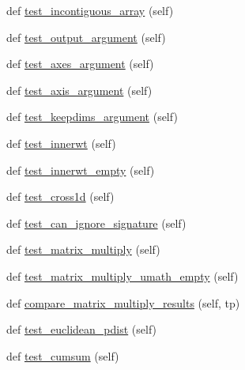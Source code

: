 \begin{DoxyCompactItemize}
\item 
def \hyperlink{classnumpy_1_1core_1_1tests_1_1test__ufunc_1_1TestUfunc_ae36bb4caf0965ee43807cb429fec7da5}{test\+\_\+incontiguous\+\_\+array} (self)
\item 
def \hyperlink{classnumpy_1_1core_1_1tests_1_1test__ufunc_1_1TestUfunc_a72edb9ebd33e63001a1295e0faae3f3a}{test\+\_\+output\+\_\+argument} (self)
\item 
def \hyperlink{classnumpy_1_1core_1_1tests_1_1test__ufunc_1_1TestUfunc_a60cb21686d58cc7c99318f96269d8993}{test\+\_\+axes\+\_\+argument} (self)
\item 
def \hyperlink{classnumpy_1_1core_1_1tests_1_1test__ufunc_1_1TestUfunc_ae047a0677ba08be66418b35d6f2aca14}{test\+\_\+axis\+\_\+argument} (self)
\item 
def \hyperlink{classnumpy_1_1core_1_1tests_1_1test__ufunc_1_1TestUfunc_ad71630de828af6888dab5eda9fe7b313}{test\+\_\+keepdims\+\_\+argument} (self)
\item 
def \hyperlink{classnumpy_1_1core_1_1tests_1_1test__ufunc_1_1TestUfunc_a5a3b0fe32bfec6be8e07f44fa5f2e7b0}{test\+\_\+innerwt} (self)
\item 
def \hyperlink{classnumpy_1_1core_1_1tests_1_1test__ufunc_1_1TestUfunc_a8978fea5198abb545b218f8e2a501b2d}{test\+\_\+innerwt\+\_\+empty} (self)
\item 
def \hyperlink{classnumpy_1_1core_1_1tests_1_1test__ufunc_1_1TestUfunc_ae35bbdf3900297f314fdb11f8af5101e}{test\+\_\+cross1d} (self)
\item 
def \hyperlink{classnumpy_1_1core_1_1tests_1_1test__ufunc_1_1TestUfunc_a7b19c00b1cc49cb07aaeef5481dd95dc}{test\+\_\+can\+\_\+ignore\+\_\+signature} (self)
\item 
def \hyperlink{classnumpy_1_1core_1_1tests_1_1test__ufunc_1_1TestUfunc_a8a416001a53478e1b0fbfdee8e1db914}{test\+\_\+matrix\+\_\+multiply} (self)
\item 
def \hyperlink{classnumpy_1_1core_1_1tests_1_1test__ufunc_1_1TestUfunc_a2e77b6f591c762e0cd1e438cad43c5ac}{test\+\_\+matrix\+\_\+multiply\+\_\+umath\+\_\+empty} (self)
\item 
def \hyperlink{classnumpy_1_1core_1_1tests_1_1test__ufunc_1_1TestUfunc_a4f6ccb6a25b8597e51727a8cf563c82a}{compare\+\_\+matrix\+\_\+multiply\+\_\+results} (self, tp)
\item 
def \hyperlink{classnumpy_1_1core_1_1tests_1_1test__ufunc_1_1TestUfunc_afc6a0fac54a50f05ec68677eb2cfacdf}{test\+\_\+euclidean\+\_\+pdist} (self)
\item 
def \hyperlink{classnumpy_1_1core_1_1tests_1_1test__ufunc_1_1TestUfunc_a325fbb256aa8aeefdded7d981cdf0d5e}{test\+\_\+cumsum} (self)

\end{DoxyCompactItemize}
